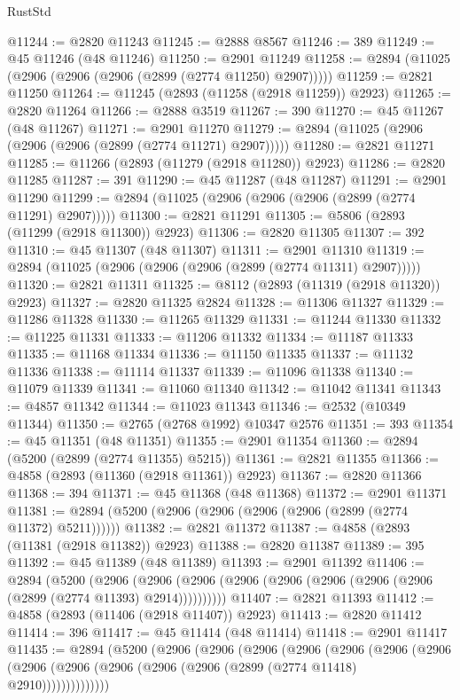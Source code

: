 \begin{lexlean}{RustStd}
\begin{coremodule}
@11244 := @2820 @11243
@11245 := @2888 @8567
@11246 := 389
@11249 := @45 @11246 (@48 @11246)
@11250 := @2901 @11249
@11258 := @2894 (@11025 (@2906 (@2906 (@2906 (@2899 (@2774 @11250) @2907)))))
@11259 := @2821 @11250
@11264 := @11245 (@2893 (@11258 (@2918 @11259)) @2923)
@11265 := @2820 @11264
@11266 := @2888 @3519
@11267 := 390
@11270 := @45 @11267 (@48 @11267)
@11271 := @2901 @11270
@11279 := @2894 (@11025 (@2906 (@2906 (@2906 (@2899 (@2774 @11271) @2907)))))
@11280 := @2821 @11271
@11285 := @11266 (@2893 (@11279 (@2918 @11280)) @2923)
@11286 := @2820 @11285
@11287 := 391
@11290 := @45 @11287 (@48 @11287)
@11291 := @2901 @11290
@11299 := @2894 (@11025 (@2906 (@2906 (@2906 (@2899 (@2774 @11291) @2907)))))
@11300 := @2821 @11291
@11305 := @5806 (@2893 (@11299 (@2918 @11300)) @2923)
@11306 := @2820 @11305
@11307 := 392
@11310 := @45 @11307 (@48 @11307)
@11311 := @2901 @11310
@11319 := @2894 (@11025 (@2906 (@2906 (@2906 (@2899 (@2774 @11311) @2907)))))
@11320 := @2821 @11311
@11325 := @8112 (@2893 (@11319 (@2918 @11320)) @2923)
@11327 := @2820 @11325 @2824
@11328 := @11306 @11327
@11329 := @11286 @11328
@11330 := @11265 @11329
@11331 := @11244 @11330
@11332 := @11225 @11331
@11333 := @11206 @11332
@11334 := @11187 @11333
@11335 := @11168 @11334
@11336 := @11150 @11335
@11337 := @11132 @11336
@11338 := @11114 @11337
@11339 := @11096 @11338
@11340 := @11079 @11339
@11341 := @11060 @11340
@11342 := @11042 @11341
@11343 := @4857 @11342
@11344 := @11023 @11343
@11346 := @2532 (@10349 @11344)
@11350 := @2765 (@2768 @1992) @10347 @2576
@11351 := 393
@11354 := @45 @11351 (@48 @11351)
@11355 := @2901 @11354
@11360 := @2894 (@5200 (@2899 (@2774 @11355) @5215))
@11361 := @2821 @11355
@11366 := @4858 (@2893 (@11360 (@2918 @11361)) @2923)
@11367 := @2820 @11366
@11368 := 394
@11371 := @45 @11368 (@48 @11368)
@11372 := @2901 @11371
@11381 := @2894 (@5200 (@2906 (@2906 (@2906 (@2906 (@2899 (@2774 @11372) @5211))))))
@11382 := @2821 @11372
@11387 := @4858 (@2893 (@11381 (@2918 @11382)) @2923)
@11388 := @2820 @11387
@11389 := 395
@11392 := @45 @11389 (@48 @11389)
@11393 := @2901 @11392
@11406 := @2894
    (@5200
      (@2906 (@2906 (@2906 (@2906 (@2906 (@2906 (@2906 (@2906 (@2899 (@2774 @11393) @2914))))))))))
@11407 := @2821 @11393
@11412 := @4858 (@2893 (@11406 (@2918 @11407)) @2923)
@11413 := @2820 @11412
@11414 := 396
@11417 := @45 @11414 (@48 @11414)
@11418 := @2901 @11417
@11435 := @2894
    (@5200
      (@2906
        (@2906
          (@2906
            (@2906
              (@2906
                (@2906
                  (@2906
                    (@2906 (@2906 (@2906 (@2906 (@2906 (@2899 (@2774 @11418) @2910))))))))))))))

\end{coremodule}
\end{lexlean}
